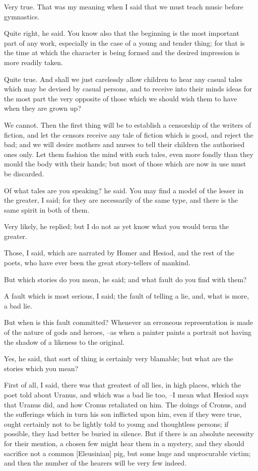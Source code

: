 Very true.
That was my meaning when I said that we must teach music before gymnastics.

Quite right, he said.
You know also that the beginning is the most important part of any work, especially in the case of a young and tender thing; for that is the time at which the character is being formed and the desired impression is more readily taken.

Quite true.
And shall we just carelessly allow children to hear any casual tales which may be devised by casual persons, and to receive into their minds ideas for the most part the very opposite of those which we should wish them to have when they are grown up?

We cannot.
Then the first thing will be to establish a censorship of the writers of fiction, and let the censors receive any tale of fiction which is good, and reject the bad; and we will desire mothers and nurses to tell their children the authorised ones only. Let them fashion the mind with such tales, even more fondly than they mould the body with their hands; but most of those which are now in use must be discarded.

Of what tales are you speaking? he said.
You may find a model of the lesser in the greater, I said; for they are necessarily of the same type, and there is the same spirit in both of them.

Very likely, he replied; but I do not as yet know what you would term the greater.

Those, I said, which are narrated by Homer and Hesiod, and the rest of the poets, who have ever been the great story-tellers of mankind.

But which stories do you mean, he said; and what fault do you find with them?

A fault which is most serious, I said; the fault of telling a lie, and, what is more, a bad lie.

But when is this fault committed?
Whenever an erroneous representation is made of the nature of gods and heroes, --as when a painter paints a portrait not having the shadow of a likeness to the original.

Yes, he said, that sort of thing is certainly very blamable; but what are the stories which you mean?

First of all, I said, there was that greatest of all lies, in high places, which the poet told about Uranus, and which was a bad lie too, --I mean what Hesiod says that Uranus did, and how Cronus retaliated on him. The doings of Cronus, and the sufferings which in turn his son inflicted upon him, even if they were true, ought certainly not to be lightly told to young and thoughtless persons; if possible, they had better be buried in silence. But if there is an absolute necessity for their mention, a chosen few might hear them in a mystery, and they should sacrifice not a common [Eleusinian] pig, but some huge and unprocurable victim; and then the number of the hearers will be very few indeed.

